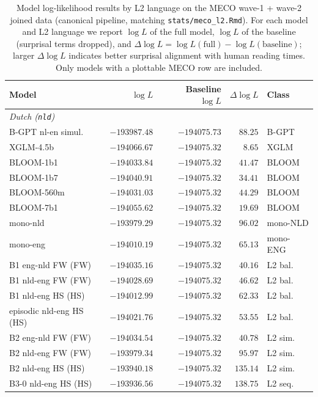 \begin{table}[!ht]
  \centering
  \small
  \caption{Model log-likelihood results by L2 language on the MECO wave-1 + wave-2 joined data (canonical pipeline, matching \texttt{stats/meco\_l2.Rmd}). For each model and L2 language we report $\log L$ of the full model, $\log L$ of the baseline (surprisal terms dropped), and $\Delta\log L = \log L(\text{full}) - \log L(\text{baseline})$; larger $\Delta\log L$ indicates better surprisal alignment with human reading times. Only models with a plottable MECO row are included.}
  \label{tab:meco_langrows}
  \begin{tabular}{lrrrl}
    \toprule
    Model & $\log L$ & Baseline $\log L$ & $\Delta\log L$ & Class \\
    \midrule
    \multicolumn{5}{l}{\textit{Dutch (\texttt{nld})}} \\
    \midrule
    B-GPT nl-en simul. & $-193987.48$ & $-194075.73$ & $88.25$ & B-GPT \\
    XGLM-4.5b & $-194066.67$ & $-194075.32$ & $8.65$ & XGLM \\
    BLOOM-1b1 & $-194033.84$ & $-194075.32$ & $41.47$ & BLOOM \\
    BLOOM-1b7 & $-194040.91$ & $-194075.32$ & $34.41$ & BLOOM \\
    BLOOM-560m & $-194031.03$ & $-194075.32$ & $44.29$ & BLOOM \\
    BLOOM-7b1 & $-194055.62$ & $-194075.32$ & $19.69$ & BLOOM \\
    mono-nld & $-193979.29$ & $-194075.32$ & $96.02$ & mono-NLD \\
    mono-eng & $-194010.19$ & $-194075.32$ & $65.13$ & mono-ENG \\
    B1 eng-nld FW (FW) & $-194035.16$ & $-194075.32$ & $40.16$ & L2 bal. \\
    B1 nld-eng FW (FW) & $-194028.69$ & $-194075.32$ & $46.62$ & L2 bal. \\
    B1 nld-eng HS (HS) & $-194012.99$ & $-194075.32$ & $62.33$ & L2 bal. \\
    episodic nld-eng HS (HS) & $-194021.76$ & $-194075.32$ & $53.55$ & L2 bal. \\
    B2 eng-nld FW (FW) & $-194034.54$ & $-194075.32$ & $40.78$ & L2 sim. \\
    B2 nld-eng FW (FW) & $-193979.34$ & $-194075.32$ & $95.97$ & L2 sim. \\
    B2 nld-eng HS (HS) & $-193940.18$ & $-194075.32$ & $135.14$ & L2 sim. \\
    B3-0 nld-eng HS (HS) & $-193936.56$ & $-194075.32$ & $138.75$ & L2 seq. \\

\end{tabular}
\end{table}

